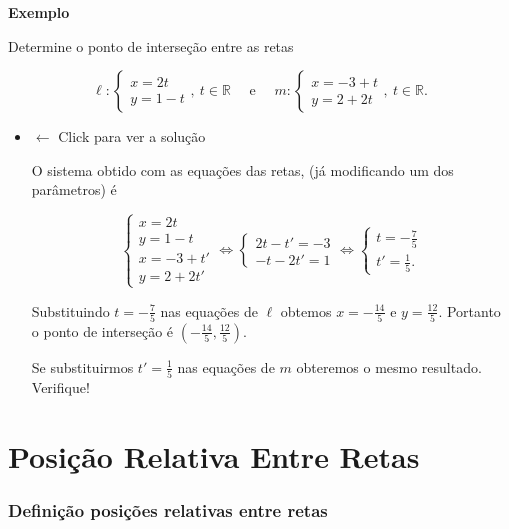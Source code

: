 \documentclass[
  brazilian,
  letterpaper,
  DIV=11,
  numbers=noendperiod]{scrreprt}
\theoremstyle{definition}
\theoremstyle{plain}
\theoremstyle{definition}
\theoremstyle{remark}
\begin{document}
\textbf{Exemplo}

Determine o ponto de interseção entre as retas

\[
 \ell:\left\{ \begin{array}{l} x=2t \\ y = 1-t  \end{array} \right., \ t \in \mathbb{R} \quad \text{ e } \quad m:\left\{ \begin{array}{l} x=-3+t \\ y = 2+2t  \end{array} \right. , \ t \in \mathbb{R}.
\]

\begin{itemize}
\item
  \(\leftarrow\) Click para ver a solução

  O sistema obtido com as equações das retas, (já modificando um dos
  parâmetros) é

  \[
    \left\{ \begin{array}{l}
    x=2t  \\
    y = 1-t  \\
    x=-3+t' \\
    y = 2+2t'
    \end{array} \right.  \Leftrightarrow \left\{ \begin{array}{l}
    2t -t'=-3 \\
    -t -2t' =1
    \end{array} \right. \Leftrightarrow \left\{
    \begin{array}{l}  t=-\frac{7}{5} \\
    t'=\frac{1}{5}.
    \end{array}
    \right.
    \]

  Substituindo \(t=-\frac{7}{5}\) nas equações de \(\ell\) obtemos
  \(x=-\frac{14}{5}\) e \(y=\frac{12}{5}\). Portanto o ponto de
  interseção é \(\left(-\frac{14}{5},\frac{12}{5}\right)\).

  Se substituirmos \(t'=\frac{1}{5}\) nas equações de \(m\) obteremos o
  mesmo resultado. Verifique!
\end{itemize}


\chapter{Posição Relativa Entre
Retas}\label{posiuxe7uxe3o-relativa-entre-retas}

\subsection{\texorpdfstring{Definição \textbf{posições relativas entre
retas}}{Definição posições relativas entre retas}}\label{definiuxe7uxe3o-posiuxe7uxf5es-relativas-entre-retas}
\end{document}
